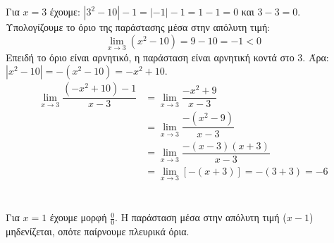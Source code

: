 \lysh
Για $x=3$ έχουμε: $|3^2-10|-1 = |-1|-1 = 1-1=0$ και $3-3=0$. Υπολογίζουμε το όριο της παράστασης μέσα στην απόλυτη τιμή:
\[ \lim\limits_{x\to 3} (x^2-10) = 9 - 10 = -1 < 0 \]
Επειδή το όριο είναι αρνητικό, η παράσταση είναι αρνητική κοντά στο 3. Άρα: ${|x^2-10| = -(x^2-10) = -x^2+10}$.
\begin{align*}
\lim\limits_{x\to 3} \dfrac{(-x^2+10) - 1}{x-3} &= \lim\limits_{x\to 3} \dfrac{-x^2 + 9}{x-3} \\
&= \lim\limits_{x\to 3} \dfrac{-(x^2 - 9)}{x-3} \\
&= \lim\limits_{x\to 3} \dfrac{-(x-3)(x+3)}{x-3} \\
&= \lim\limits_{x\to 3} [-(x+3)] = -(3+3) = {-6}
\end{align*}
\\\\
\lysh
Για $x=1$ έχουμε μορφή $\frac{0}{0}$. Η παράσταση μέσα στην απόλυτη τιμή ($x-1$) μηδενίζεται, οπότε παίρνουμε πλευρικά όρια.

